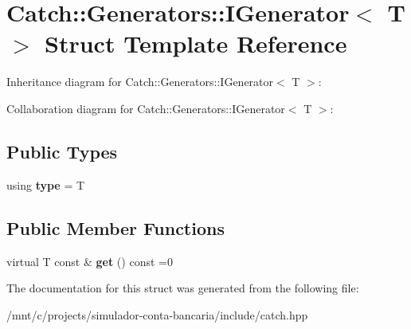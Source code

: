\hypertarget{structCatch_1_1Generators_1_1IGenerator}{}\section{Catch\+:\+:Generators\+:\+:I\+Generator$<$ T $>$ Struct Template Reference}
\label{structCatch_1_1Generators_1_1IGenerator}


Inheritance diagram for Catch\+:\+:Generators\+:\+:I\+Generator$<$ T $>$\+:


Collaboration diagram for Catch\+:\+:Generators\+:\+:I\+Generator$<$ T $>$\+:
\subsection*{Public Types}
\begin{DoxyCompactItemize}
\item 
\mbox{\label{structCatch_1_1Generators_1_1IGenerator_a1f8677875fe0ff31f39c60d45504b9a5}} 
using {\bfseries type} = T
\end{DoxyCompactItemize}
\subsection*{Public Member Functions}
\begin{DoxyCompactItemize}
\item 
\mbox{\label{structCatch_1_1Generators_1_1IGenerator_a525d381fc9249a885b075a0632a8579a}} 
virtual T const  \& {\bfseries get} () const =0
\end{DoxyCompactItemize}


The documentation for this struct was generated from the following file\+:\begin{DoxyCompactItemize}
\item 
/mnt/c/projects/simulador-\/conta-\/bancaria/include/catch.\+hpp\end{DoxyCompactItemize}
